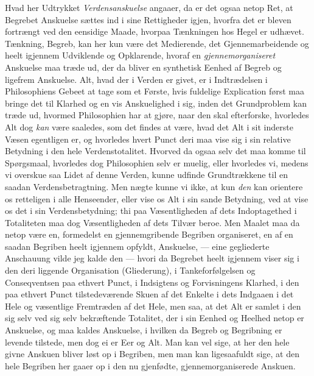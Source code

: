 \documentclass[12pt,a4paper]{book}
\newcommand{\apage}[1]{\marginnote{\footnotesize\textit{[#1]}}}
\begin{document}
Hvad her Udtrykket \emph{Verdensanskuelse} angaaer, da er det ogsaa netop Ret,
at Begrebet Anskuelse sættes ind i sine Rettigheder igjen, hvorfra det
er bleven fortrængt ved den eensidige Maade, hvorpaa Tænkningen hos
Hegel er udhævet. Tænkning, Begreb, kan her kun være det Medierende,
det Gjennemarbeidende og heelt igjennem Udviklende og Opklarende, hvoraf
en \emph{gjennemorganiseret} Anskuelse maa træde ud, der da bliver en
synthetisk Eenhed af Begreb og ligefrem Anskuelse. Alt, hvad der i
Verden er givet, er i Indtrædelsen i Philosophiens Gebeet at tage som
et Første, hvis fuldelige Explication først maa bringe det til Klarhed
og en vis Anskuelighed i sig, inden det Grundproblem kan træde ud,
hvormed Philosophien har at gjøre, naar den skal efterforske, hvorledes
Alt dog \emph{kan} være saaledes, som det findes at være, hvad det Alt i sit
inderste Væsen egentligen er, og hvorledes hvert Punct deri maa vise
sig i sin relative Betydning i den hele Verdenstotalitet. Hvorved da
ogsaa selv det maa komme til Spørgsmaal, hvorledes dog Philosophien selv
er muelig, \apage{56} eller hvorledes vi, medens vi overskue saa Lidet af denne
Verden, kunne udfinde Grundtrækkene til en saadan Verdensbetragtning.
Men nægte kunne vi ikke, at kun \emph{den} kan orientere os retteligen i alle
Henseender, eller vise os Alt i sin sande Betydning, ved at vise os det
i sin Verdensbetydning; thi paa Væsentligheden af dets Indoptagethed i
Totaliteten maa dog Væsentligheden af dets Tilvær beroe. Men Maalet maa
da netop være en, formedelst en gjennemgribende Begriben organiseret,
en af en saadan Begriben heelt igjennem opfyldt, Anskuelse, --- eine
gegliederte Anschauung vilde jeg kalde den --- hvori da Begrebet heelt
igjennem viser sig i den deri liggende Organisation (Gliederung), i
Tankeforfølgelsen og Conseqventsen paa ethvert Punct, i Indsigtens og
Forvisningens Klarhed, i den paa ethvert Punct tilstedeværende Skuen af
det Enkelte i dets Indgaaen i det Hele og væsentlige Fremtræden af det
Hele, men saa, at det Alt er samlet i den sig selv ved sig selv
bekræftende Totalitet, der i sin Eenhed og Heelhed netop er Anskuelse,
og maa kaldes Anskuelse, i hvilken da Begreb og Begribning er levende
tilstede, men dog ei er Eer og Alt. Man kan vel sige, at her den hele
givne Anskuen bliver løst op i Begriben, men man kan ligesaafuldt sige,
at den hele Begriben her gaaer op i den nu gjenfødte, gjennemorganiserede
Anskuen.
\end{document}
